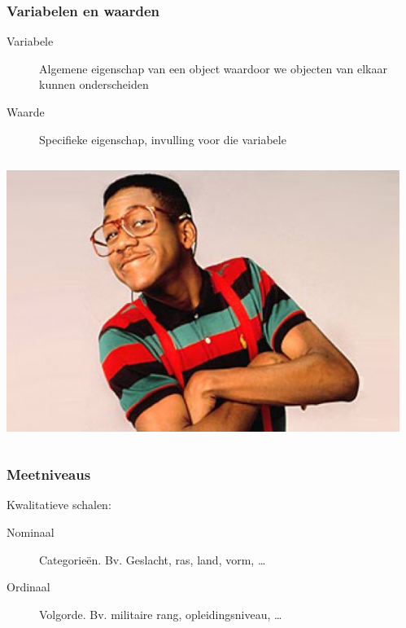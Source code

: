 \documentclass[aspectratio=169]{beamer}
\begin{document}
\begin{frame}
  \frametitle{Variabelen en waarden}

  \begin{description}
    \item[Variabele] Algemene eigenschap van een object waardoor we objecten van elkaar kunnen onderscheiden
    \item[Waarde] Specifieke eigenschap, invulling voor die variabele
  \end{description}

  \vspace{1cm}

  \begin{columns}[c]
    \centering
    \includegraphics[width=.7\textwidth]{img/les1-07}

    \\
    \vspace{.5cm}
    \\
    \vspace{.5cm}

  \end{columns}
\end{frame}

\begin{frame}
  \frametitle{Meetniveaus}

  Kwalitatieve schalen:

  \begin{description}
    \item[Nominaal] Categorieën. Bv. Geslacht, ras, land, vorm, \ldots
    \item[Ordinaal] Volgorde. Bv. militaire rang, opleidingsniveau, \ldots
  \end{description}

\end{frame}
\end{document}
